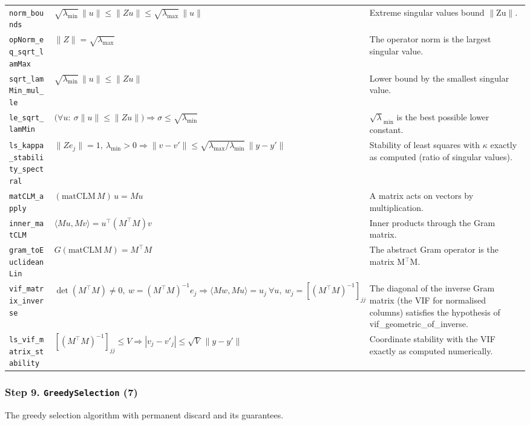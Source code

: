 {\begin{longtable}{@{}>{\raggedright\arraybackslash}p{3.6cm}>{\raggedright\arraybackslash}p{6.6cm}>{\raggedright\arraybackslash}p{5.6cm}@{}}
\texttt{norm\_\allowbreak{}bounds} & $\displaystyle \sqrt{\lambda_{\min}}\,\|u\|\le\|Zu\|\le\sqrt{\lambda_{\max}}\,\|u\|$ & Extreme singular values bound $\|$Zu$\|$. \\[3pt]
\texttt{opNorm\_\allowbreak{}eq\_\allowbreak{}sqrt\_\allowbreak{}lamMax} & $\displaystyle \|Z\|=\sqrt{\lambda_{\max}}$ & The operator norm is the largest singular value. \\[3pt]
\texttt{sqrt\_\allowbreak{}lamMin\_\allowbreak{}mul\_\allowbreak{}le} & $\displaystyle \sqrt{\lambda_{\min}}\,\|u\|\le\|Zu\|$ & Lower bound by the smallest singular value. \\[3pt]
\texttt{le\_\allowbreak{}sqrt\_\allowbreak{}lamMin} & $\displaystyle \bigl(\forall u:\ \sigma\|u\|\le\|Zu\|\bigr)\Rightarrow\sigma\le\sqrt{\lambda_{\min}}$ & $\surd\lambda_{\min}$ is the best possible lower constant. \\[3pt]
\texttt{ls\_\allowbreak{}kappa\_\allowbreak{}stability\_\allowbreak{}spectral} & $\displaystyle \|Ze_j\|=1,\ \lambda_{\min}>0\Rightarrow\|v-v'\|\le\sqrt{\lambda_{\max}/\lambda_{\min}}\,\|y-y'\|$ & Stability of least squares with $\kappa$ exactly as computed (ratio of singular values). \\[3pt]
\texttt{matCLM\_\allowbreak{}apply} & $\displaystyle (\mathrm{matCLM}\,M)\,u=Mu$ & A matrix acts on vectors by multiplication. \\[3pt]
\texttt{inner\_\allowbreak{}matCLM} & $\displaystyle \langle Mu,Mv\rangle=u^\top(M^\top M)v$ & Inner products through the Gram matrix. \\[3pt]
\texttt{gram\_\allowbreak{}toEuclideanLin} & $\displaystyle G(\mathrm{matCLM}\,M)=M^\top M$ & The abstract Gram operator is the matrix M$^\top$M. \\[3pt]
\texttt{vif\_\allowbreak{}matrix\_\allowbreak{}inverse} & $\displaystyle \det(M^\top M)\ne0,\ w=(M^\top M)^{-1}e_j\Rightarrow\langle Mw,Mu\rangle=u_j\ \forall u,\ w_j=[(M^\top M)^{-1}]_{jj}$ & The diagonal of the inverse Gram matrix (the VIF for normalised columns) satisfies the hypothesis of vif\_geometric\_of\_inverse. \\[3pt]
\texttt{ls\_\allowbreak{}vif\_\allowbreak{}matrix\_\allowbreak{}stability} & $\displaystyle [(M^\top M)^{-1}]_{jj}\le V\Rightarrow|v_j-v'_j|\le\sqrt V\,\|y-y'\|$ & Coordinate stability with the VIF exactly as computed numerically. \\[3pt]
\bottomrule
\end{longtable}
}

\subsubsection*{Step 9. \texttt{GreedySelection} (7)}
The greedy selection algorithm with permanent discard and its guarantees.

